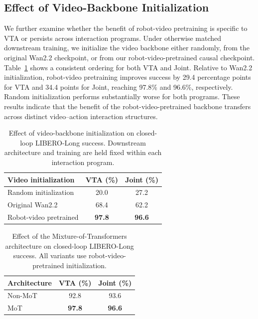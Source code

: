 \subsection{Effect of Video-Backbone Initialization}
\label{app:init-ablation}
We further examine whether the benefit of robot-video pretraining is specific to
VTA or persists across interaction programs. Under otherwise matched downstream
training, we initialize the video backbone either randomly, from the original
Wan2.2 checkpoint, or from our robot-video-pretrained causal checkpoint.
Table~\ref{tab:init-program-ablation} shows a consistent ordering for both VTA
and Joint. Relative to Wan2.2 initialization, robot-video pretraining improves
success by 29.4 percentage points for VTA and 34.4 points for Joint, reaching
97.8\% and 96.6\%, respectively. Random initialization performs substantially
worse for both programs. These results indicate that the benefit of the
robot-video-pretrained backbone transfers across distinct video--action interaction
structures.

\begin{table}[t]
    \centering
    \caption{
    Effect of video-backbone initialization on closed-loop LIBERO-Long success.
    Downstream architecture and training are held fixed within each interaction
    program.
    }
    \label{tab:init-program-ablation}
    \small
    \begin{tabular}{@{}lcc@{}}
        \toprule
        \textbf{Video initialization}
        & \textbf{VTA (\%)}
        & \textbf{Joint (\%)} \\
        \midrule
        Random initialization
        & 20.0
        & 27.2 \\
        Original Wan2.2
        & 68.4
        & 62.2 \\
        Robot-video pretrained
        & \textbf{97.8}
        & \textbf{96.6} \\
        \bottomrule
    \end{tabular}
\end{table}

\begin{table}[t]
    \centering
    \caption{
    Effect of the Mixture-of-Transformers architecture on closed-loop
    LIBERO-Long success. All variants use robot-video-pretrained
    initialization.
    }
    \label{tab:mot-ablation}
    \small
    \begin{tabular}{@{}lcc@{}}
        \toprule
        \textbf{Architecture}
        & \textbf{VTA (\%)}
        & \textbf{Joint (\%)} \\
        \midrule
        Non-MoT
        & 92.8
        & 93.6 \\
        MoT
        & \textbf{97.8}
        & \textbf{96.6} \\
        \bottomrule
    \end{tabular}
\end{table}

